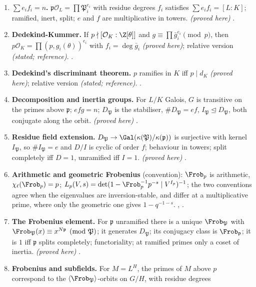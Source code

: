 \begin{enumerate}[label=\textbf{\thechapter.\arabic*}]
.
\item \textbf{$\sum e_if_i=n$.} $\mathfrak p\mathcal O_L=\prod\mathfrak P_i^{e_i}$ with residue degrees $f_i$ satisfies $\sum e_if_i=[L:K]$; ramified, inert, split; $e$ and $f$
are multiplicative in towers. \emph{(proved here)} .
\item \textbf{Dedekind-Kummer.} If $p\nmid[\mathcal O_K:\Z[\theta]]$ and $g\equiv\prod\bar g_i^{e_i}\pmod p$, then $p\mathcal O_K=\prod(p,g_i(\theta))^{e_i}$ with
$f_i=\deg\bar g_i$ \emph{(proved here)}; relative version \emph{(stated; reference)}. .
\item \textbf{Dedekind's discriminant theorem.} $p$ ramifies in $K$ iff $p\mid d_K$ \emph{(proved here)}; relative version \emph{(stated; reference)}.
.
\item \textbf{Decomposition and inertia groups.} For $L/K$ Galois, $G$ is transitive on the primes above $\mathfrak p$; $efg=n$; $D_{\mathfrak P}$ is the stabiliser,
$\#D_{\mathfrak P}=ef$, $I_{\mathfrak P}\trianglelefteq D_{\mathfrak P}$, both conjugate along the orbit. \emph{(proved here)} .
\item \textbf{Residue field extension.} $D_{\mathfrak P}\to\Gal(\kappa(\mathfrak P)/\kappa(\mathfrak p))$ is surjective with kernel $I_{\mathfrak P}$, so $\#I_{\mathfrak P}=e$ and
$D/I$ is cyclic of order $f$; behaviour in towers; split completely iff $D=1$, unramified iff $I=1$. \emph{(proved here)} .
\item \textbf{Arithmetic and geometric Frobenius} (convention): $\Frob_p$ is arithmetic, $\chi_\ell(\Frob_p)=p$; $L_p(V,s)=\det(1-\Frob_p^{-1}p^{-s}\mid V^{I_p})^{-1}$; the two
conventions agree when the eigenvalues are inversion-stable, and differ at a multiplicative prime, where only the geometric one gives $1-q^{-1-s}$.
, .
\item \textbf{The Frobenius element.} For $\mathfrak p$ unramified there is a unique $\Frob_{\mathfrak P}$ with $\Frob_{\mathfrak P}(x)\equiv x^{N\mathfrak p}\pmod{\mathfrak P}$; it
generates $D_{\mathfrak P}$; its conjugacy class is $\Frob_{\mathfrak p}$; it is $1$ iff $\mathfrak p$ splits completely; functoriality; at ramified primes only a coset of
inertia. \emph{(proved here)} .
\item \textbf{Frobenius and subfields.} For $M=L^H$, the primes of $M$ above $p$ correspond to the $\langle\Frob_{\mathfrak P}\rangle$-orbits on $G/H$, with residue degrees

\end{enumerate}
